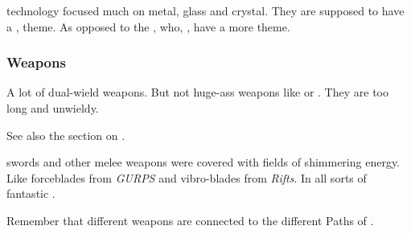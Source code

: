 \Resphan technology focused much on metal, glass and crystal.
They are supposed to have a ,  theme.
As opposed to the \dragons, who, , have a more  theme. 






\subsubsection{Weapons}
A lot of \resphain{} dual-wield weapons. 
But not huge-ass weapons like \senain{} or \belthradeth. 
They are too long and unwieldy. 

See also the section on . 

\Resphan swords and other melee weapons were covered with fields of shimmering energy.
Like forceblades from \emph{GURPS} and vibro-blades from \emph{Rifts}.
In all sorts of fantastic \colours. 

Remember that different weapons are connected to the different Paths of . 



